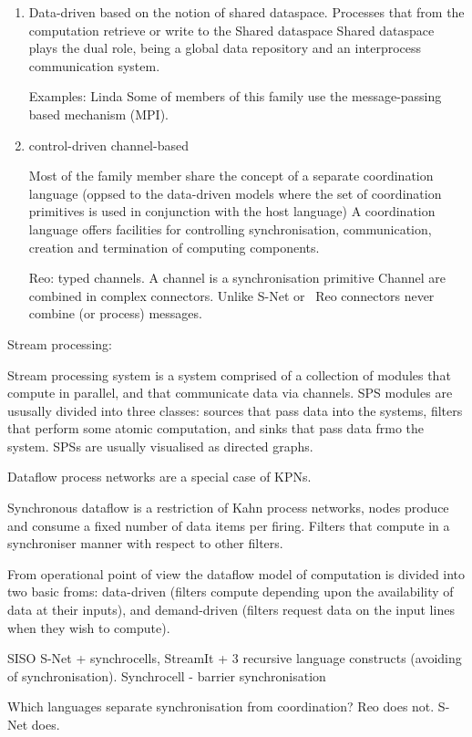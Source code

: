 \begin{enumerate}
\item Data-driven
based on the notion of shared dataspace.
Processes that from the computation retrieve or write to the Shared dataspace
Shared dataspace plays the dual role, being a global data repository and an interprocess communication system.

Examples: Linda
Some of members of this family use the message-passing based mechanism (MPI).

\item control-driven
channel-based

Most of the family member share the concept of a separate coordination language (oppsed to the data-driven models where the set of coordination primitives is used in conjunction with the host language)
A coordination language offers facilities for controlling synchronisation, communication, creation and termination of computing components.

Reo: typed channels. A channel is a synchronisation primitive
Channel are combined in complex connectors.
Unlike S-Net or \ak\, Reo connectors never combine (or process) messages.

\end{enumerate}



Stream processing:

Stream processing system is a system comprised of a collection of modules that compute in parallel, and that communicate data via channels. SPS modules are ususally divided into three classes: sources that pass data into the systems, filters that perform some atomic computation, and sinks that pass data frmo the system. SPSs are usually visualised as directed graphs.

Dataflow process networks are a special case of KPNs.

Synchronous dataflow is a restriction of Kahn process networks, nodes produce and consume a fixed number of data items per firing. Filters that compute in a synchroniser manner with respect to other filters.

From operational point of view the dataflow model of computation is divided into two basic froms:
data-driven (filters compute depending upon the availability of data at their inputs), and demand-driven (filters request data on the input lines when they wish to compute).



SISO
S-Net + synchrocells, StreamIt + 3 recursive language constructs (avoiding of synchronisation).
Synchrocell - barrier synchronisation


Which languages separate synchronisation from coordination?
Reo does not.
S-Net does.
